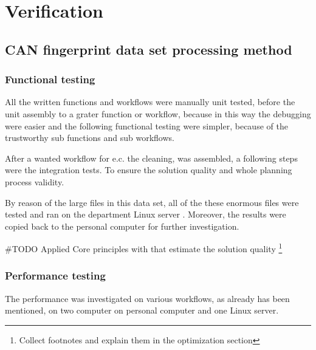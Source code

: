 \chapter{Verification}
\section{CAN fingerprint data set processing method}
\subsection{Functional testing}
All the written functions and workflows were manually unit tested, before the unit assembly to a grater function or workflow, because in this way the debugging were easier and the following functional testing were simpler, because of the trustworthy sub functions and sub workflows.

After a wanted workflow for e.c. the cleaning, was assembled, a following steps were the integration tests. To ensure the solution quality and whole planning process validity.

By reason of the large files in this data set, all of the these enormous files were tested and ran on the department Linux server \cite{Batman}.
Moreover, the results were copied back to the personal computer for further investigation.

\#TODO Applied Core principles with that estimate the solution quality
\footnote{Collect footnotes and explain them in the optimization section}
\subsection{Performance testing}
The performance was investigated on various workflows, as already has been mentioned, on two computer on personal computer\cite{Latitude} and one Linux server\cite{Batman}.

